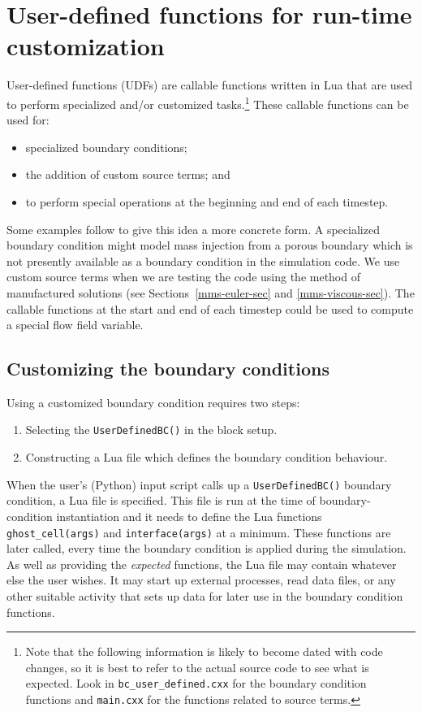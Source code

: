 \section{User-defined functions for run-time customization}
\label{udf-sec}
User-defined functions (UDFs) are callable functions written in Lua
that are used to perform specialized and/or customized tasks.\footnote{Note that the following information 
is likely to become dated with code changes,
so it is best to refer to the actual source code to see what is expected.
Look in \texttt{bc\_user\_defined.cxx} for the boundary condition functions and \texttt{main.cxx} for the 
functions related to source terms.}
These callable functions can be used for:
\begin{itemize}
\item specialized boundary conditions;
\item the addition of custom source terms; and
\item to perform special operations at the beginning and end of each timestep.
\end{itemize}
Some examples follow to give this idea a more concrete form.
A specialized boundary condition might model mass injection
from a porous boundary which is not presently available as a boundary condition
in the simulation code.
We use custom source terms when we are testing the code using the
method of manufactured solutions (see Sections~\ref{mms-euler-sec} and \ref{mms-viscous-sec}).
The callable functions at the start and end of each timestep could be used
to compute a special flow field variable.

\subsection{Customizing the boundary conditions}
Using a customized boundary condition requires two steps:
\begin{enumerate}
\item Selecting the \texttt{UserDefinedBC()} in the block setup.
\item Constructing a Lua file which defines the boundary condition behaviour.
\end{enumerate}

When the user's (Python) input script calls up a \texttt{UserDefinedBC()} boundary condition,
a Lua file is specified.
This file is run at the time of boundary-condition instantiation and it needs to define the
Lua functions \texttt{ghost\_cell(args)} and \texttt{interface(args)} at a minimum.
These functions are later called, every time the boundary condition is applied during the simulation.
As well as providing the \textit{expected} functions, the Lua file may contain whatever else
the user wishes.
It may start up external processes, read data files, or any other suitable activity that
sets up data for later use in the boundary condition functions.

